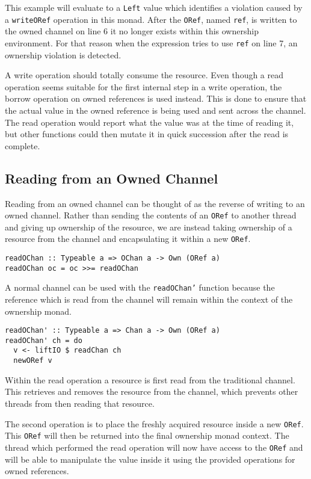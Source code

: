 \documentclass[onehalf,11pt]{beavtex}
\begin{document}
This example will evaluate to a \texttt{Left} value which identifies a
violation caused by a \texttt{writeORef} operation in this monad.
After the \texttt{ORef}, named \texttt{ref}, is written to the owned channel on
line 6 it no longer exists within this ownership environment.
For that reason when the expression tries to use \texttt{ref} on line 7, an
ownership violation is detected.

A write operation should totally consume the resource.
Even though a read operation seems suitable for the first internal step in a
write operation, the borrow operation on owned references is used instead.
This is done to ensure that the actual value in the owned reference is being
used and sent across the channel.
The read operation would report what the value was at the time of reading it,
but other functions could then mutate it in quick succession after the read is
complete. %

\subsection{Reading from an Owned Channel}

Reading from an owned channel can be thought of as the reverse of writing to an
owned channel.
Rather than sending the contents of an \texttt{ORef} to another thread and giving 
up ownership of the resource,
we are instead taking ownership of a resource from the channel and encapsulating
it within a new \texttt{ORef}.

\begin{verbatim}
readOChan :: Typeable a => OChan a -> Own (ORef a)
readOChan oc = oc >>= readOChan
\end{verbatim}

A normal channel can be used with the \texttt{readOChan'} function because
the reference which is read from the channel will remain within the context
of the ownership monad. 

\begin{verbatim}
readOChan' :: Typeable a => Chan a -> Own (ORef a)
readOChan' ch = do
  v <- liftIO $ readChan ch
  newORef v
\end{verbatim}

Within the read operation a resource is first read from the traditional channel.
This retrieves and removes the resource from the channel, which prevents other
threads from then reading that resource.

The second operation is to place the freshly acquired resource inside a new
\texttt{ORef}.  This \texttt{ORef} will then be returned into the
final ownership monad context.
The thread which performed the read operation will now have access to the
\texttt{ORef} and will be able to manipulate the value inside it using the
provided operations for owned references. \\
\end{document}
